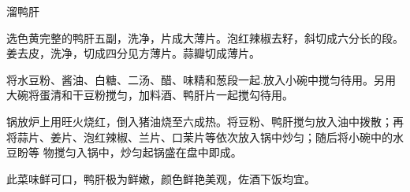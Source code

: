 \begin{recipe}{溜鸭肝}

\ingredients


\preparation

\step 选色黄完整的鸭肝五副，洗净，片成大薄片。泡红辣椒去籽，斜切成六分长的段。
姜去皮，洗净，切成四分见方薄片。蒜瓣切成薄片。

\step 将水豆粉、酱油、白糖、二汤、醋、味精和葱段一起.放入小碗中搅匀待用。另用
大碗将蛋清和干豆粉搅匀，加料酒、鸭肝片一起搅勾待用。

\step 锅放炉上用旺火烧红，倒入猪油烧至六成热。将豆粉、鸭肝搅匀放入油中拨散；再
将蒜片、姜片、泡红辣椒、兰片、口茉片等依次放入锅中炒匀；随后将小碗中的水豆盼等
物搅匀入锅中，炒匀起锅盛在盘中即成。

\features

此菜味鲜可口，鸭肝极为鲜嫩，颜色鲜艳美观，佐酒下饭均宜。

\end{recipe}


